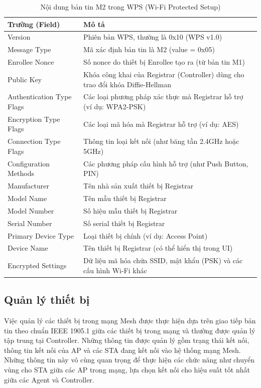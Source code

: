 \begin{table}[ht]
\centering
\caption{Nội dung bản tin M2 trong WPS (Wi-Fi Protected Setup)}
\begin{tabular}{|>{\raggedright\arraybackslash}m{4cm}|>{\raggedright\arraybackslash}m{9cm}|}
\hline
\textbf{Trường (Field)} & \textbf{Mô tả} \\
\hline
Version & Phiên bản WPS, thường là 0x10 (WPS v1.0) \\
\hline
Message Type & Mã xác định bản tin là M2 (value = 0x05) \\
\hline
Enrollee Nonce & Số nonce do thiết bị Enrollee tạo ra (từ bản tin M1) \\
\hline
Public Key & Khóa công khai của Registrar (Controller) dùng cho trao đổi khóa Diffie-Hellman \\
\hline
Authentication Type Flags & Các loại phương pháp xác thực mà Registrar hỗ trợ (ví dụ: WPA2-PSK) \\
\hline
Encryption Type Flags & Các loại mã hóa mà Registrar hỗ trợ (ví dụ: AES) \\
\hline
Connection Type Flags & Thông tin loại kết nối (như băng tần 2.4GHz hoặc 5GHz) \\
\hline
Configuration Methods & Các phương pháp cấu hình hỗ trợ (như Push Button, PIN) \\
\hline
Manufacturer & Tên nhà sản xuất thiết bị Registrar \\
\hline
Model Name & Tên mẫu thiết bị Registrar \\
\hline
Model Number & Số hiệu mẫu thiết bị Registrar \\
\hline
Serial Number & Số serial thiết bị Registrar \\
\hline
Primary Device Type & Loại thiết bị chính (ví dụ: Access Point) \\
\hline
Device Name & Tên thiết bị Registrar (có thể hiển thị trong UI) \\
\hline
Encrypted Settings & Dữ liệu mã hóa chứa SSID, mật khẩu (PSK) và các cấu hình Wi-Fi khác \\
\hline
\end{tabular}
\end{table}

\subsection{Quản lý thiết bị}
Việc quản lý các thiết bị trong mạng Mesh được thực hiện dựa trên giao tiếp bản tin theo chuẩn IEEE 1905.1 giữa các thiết bị trong mạng và thường được quản lý tập trung tại Controller. Những thông tin được quản lý gồm trạng thái kết nối, thông tin kết nối của AP và các STA đang kết nối vào hệ thống mạng Mesh. Những thông tin này vô cùng quan trọng để thực hiện các chức năng như chuyển vùng cho STA giữa các AP trong mạng, lựa chọn kết nối cho hiệu suất tốt nhất giữa các Agent và Controller. 

